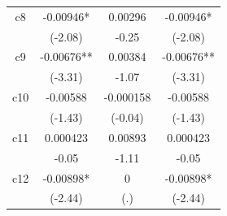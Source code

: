 \documentclass[man]{apa7}
\begin{document}
\begin{table}[htbp]
\begin{tabular}{cccc}
    \multicolumn{1}{p{4.215em}}{c8}  & -0.00946*                    & \multicolumn{1}{c}{0.00296}   & -0.00946*                    \\
                                     & (-2.08)                      & \multicolumn{1}{c}{-0.25}     & (-2.08)                      \\
    \multicolumn{1}{p{4.215em}}{c9}  & -0.00676**                   & \multicolumn{1}{c}{0.00384}   & -0.00676**                   \\
                                     & (-3.31)                      & \multicolumn{1}{c}{-1.07}     & (-3.31)                      \\
    \multicolumn{1}{p{4.215em}}{c10} & \multicolumn{1}{c}{-0.00588} & \multicolumn{1}{c}{-0.000158} & \multicolumn{1}{c}{-0.00588} \\
                                     & (-1.43)                      & (-0.04)                       & (-1.43)                      \\
    \multicolumn{1}{p{4.215em}}{c11} & \multicolumn{1}{c}{0.000423} & \multicolumn{1}{c}{0.00893}   & \multicolumn{1}{c}{0.000423} \\
                                     & \multicolumn{1}{c}{-0.05}    & \multicolumn{1}{c}{-1.11}     & \multicolumn{1}{c}{-0.05}    \\
    \multicolumn{1}{p{4.215em}}{c12} & -0.00898*                    & \multicolumn{1}{c}{0}         & -0.00898*                    \\
                                     & (-2.44)                      & (.)                           & (-2.44)                      \\
    \bottomrule
  \end{tabular}%
  \label{Table 2.7}%
\end{table}%
\end{document}
